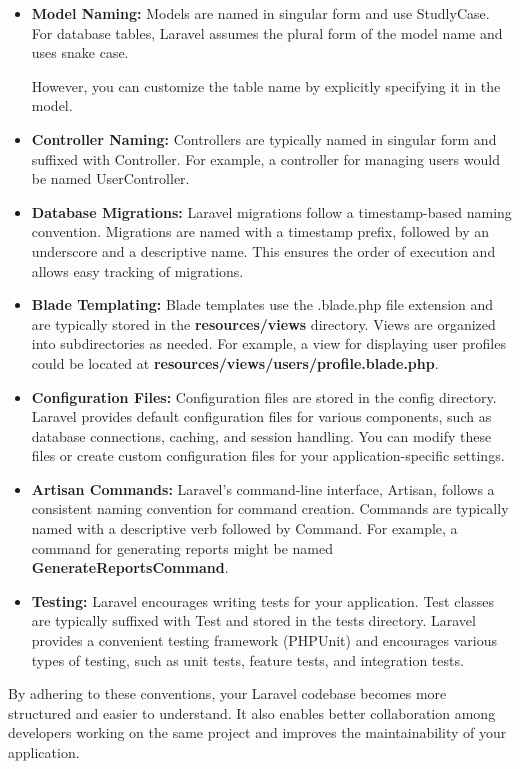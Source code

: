 \begin{itemize}
\begin{itemize}
\begin{itemize}
\item \textbf{Model Naming:} Models are named in singular form and use StudlyCase. For database tables, Laravel assumes the plural form of the model name and uses snake case. 

However, you can customize the table name by explicitly specifying it in the model.

\item \textbf{Controller Naming:} Controllers are typically named in singular form and suffixed with Controller. For example, a controller for managing users would be named UserController.

\item \textbf{Database Migrations:} Laravel migrations follow a timestamp-based naming convention. Migrations are named with a timestamp prefix, followed by an underscore and a descriptive name. This ensures the order of execution and allows easy tracking of migrations.

\item \textbf{Blade Templating:} Blade templates use the .blade.php file extension and are typically stored in the \textbf{resources/views} directory. Views are organized into subdirectories as needed. For example, a view for displaying user profiles could be located at \textbf{resources/views/users/profile.blade.php}.

\item \textbf{Configuration Files:} Configuration files are stored in the config directory. Laravel provides default configuration files for various components, such as database connections, caching, and session handling. You can modify these files or create custom configuration files for your application-specific settings.

\item \textbf{Artisan Commands:} Laravel's command-line interface, Artisan, follows a consistent naming convention for command creation. Commands are typically named with a descriptive verb followed by Command. For example, a command for generating reports might be named \textbf{GenerateReportsCommand}.

\item \textbf{Testing:} Laravel encourages writing tests for your application. Test classes are typically suffixed with Test and stored in the tests directory. Laravel provides a convenient testing framework (PHPUnit) and encourages various types of testing, such as unit tests, feature tests, and integration tests.
\end{itemize}
\medskip By adhering to these conventions, your Laravel codebase becomes more structured and easier to understand. It also enables better collaboration among developers working on the same project and improves the maintainability of your application.


\end{itemize}
\end{itemize}
